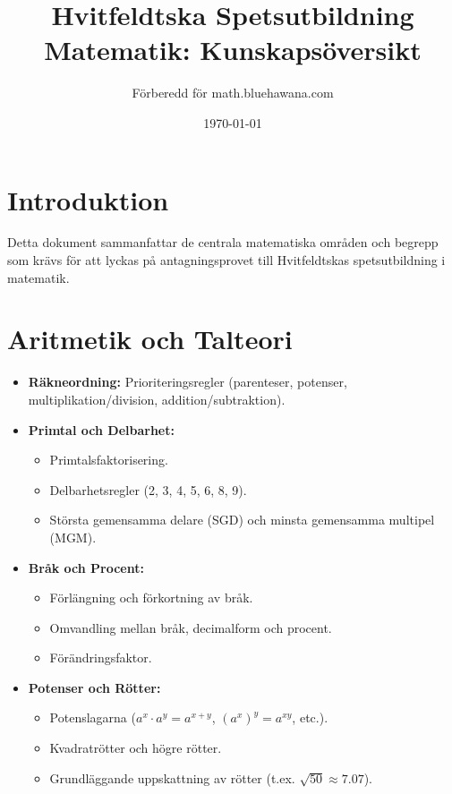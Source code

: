 \documentclass[11pt, a4paper]{article}
\title{\textbf{Hvitfeldtska Spetsutbildning Matematik: Kunskapsöversikt}}
\author{Förberedd för math.bluehawana.com}
\date{\today}
\begin{document}
\maketitle

\section{Introduktion}
Detta dokument sammanfattar de centrala matematiska områden och begrepp som krävs för att lyckas på antagningsprovet till Hvitfeldtskas spetsutbildning i matematik.

\section{Aritmetik och Talteori}
\begin{itemize}
    \item \textbf{Räkneordning:} Prioriteringsregler (parenteser, potenser, multiplikation/division, addition/subtraktion).
    \item \textbf{Primtal och Delbarhet:}
    \begin{itemize}
        \item Primtalsfaktorisering.
        \item Delbarhetsregler (2, 3, 4, 5, 6, 8, 9).
        \item Största gemensamma delare (SGD) och minsta gemensamma multipel (MGM).
    \end{itemize}
    \item \textbf{Bråk och Procent:}
    \begin{itemize}
        \item Förlängning och förkortning av bråk.
        \item Omvandling mellan bråk, decimalform och procent.
        \item Förändringsfaktor.
    \end{itemize}
    \item \textbf{Potenser och Rötter:}
    \begin{itemize}
        \item Potenslagarna ($a^x \cdot a^y = a^{x+y}$, $(a^x)^y = a^{xy}$, etc.).
        \item Kvadratrötter och högre rötter.
        \item Grundläggande uppskattning av rötter (t.ex. $\sqrt{50} \approx 7.07$).
    \end{itemize}
\end{itemize}
\end{document}
